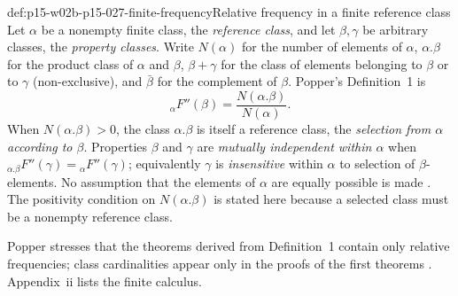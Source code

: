 \begin{hbdefinition}{def:p15-w02b-p15-027-finite-frequency}{Relative frequency in a finite reference class}
Let \(\alpha\) be a nonempty finite class, the \emph{reference class},
and let \(\beta,\gamma\) be arbitrary classes, the \emph{property
classes}. Write \(N(\alpha)\) for the number of elements of \(\alpha\),
\(\alpha.\beta\) for the product class of \(\alpha\) and \(\beta\),
\(\beta+\gamma\) for the class of elements belonging to \(\beta\) or to
\(\gamma\) (non-exclusive), and \(\bar\beta\) for the complement of
\(\beta\). Popper's Definition~1 is
\[
  {}_{\alpha}F''(\beta)=\frac{N(\alpha.\beta)}{N(\alpha)} .
\]
When \(N(\alpha.\beta)>0\), the class \(\alpha.\beta\) is itself a
reference class, the \emph{selection from \(\alpha\) according to
\(\beta\)}. Properties \(\beta\) and \(\gamma\) are \emph{mutually
independent within \(\alpha\)} when
\({}_{\alpha.\beta}F''(\gamma)={}_{\alpha}F''(\gamma)\); equivalently
\(\gamma\) is \emph{insensitive} within \(\alpha\) to selection of
\(\beta\)-elements.
No assumption that the elements of \(\alpha\) are equally possible is
made \parencite[\S\S52--53, with note~*1 to \S52]{Popper2002LogicDiscoveryUI}.
The positivity condition on \(N(\alpha.\beta)\) is stated here because a
selected class must be a nonempty reference class.
\end{hbdefinition}

Popper stresses that the theorems derived from Definition~1 contain only
relative frequencies; class cardinalities appear only in the proofs
of the first theorems \parencite[\S52]{Popper2002LogicDiscoveryUI}.
Appendix~ii lists the finite calculus.

